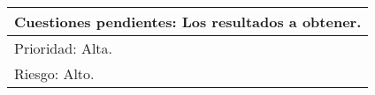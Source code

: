 \begin{longtable}{|l|l|}
\multicolumn{2}{|l|}{Cuestiones pendientes: Los resultados a obtener.}                                                                                                                                                                                                                                                                                                                                                                                                                                                                                                                                        \\ \hline
\multicolumn{2}{|l|}{Prioridad: Alta.}                                                                                                                                                                                                                                                                                                                                                                                                                                                                                                                                                                        \\ \hline
\multicolumn{2}{|l|}{Riesgo: Alto.}                                                                                                                                                                                                                                                                                                                                                                                                                                                                                                                                                                           \\ \hline
\end{longtable}